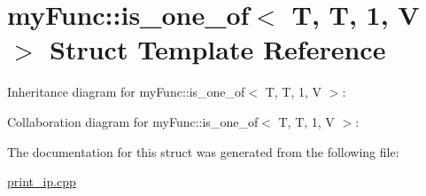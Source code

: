 \hypertarget{structmyFunc_1_1is__one__of_3_01T_00_01T_00_011_00_01V_01_4}{}\section{my\+Func\+:\+:is\+\_\+one\+\_\+of$<$ T, T, 1, V $>$ Struct Template Reference}
\label{structmyFunc_1_1is__one__of_3_01T_00_01T_00_011_00_01V_01_4}


Inheritance diagram for my\+Func\+:\+:is\+\_\+one\+\_\+of$<$ T, T, 1, V $>$\+:


Collaboration diagram for my\+Func\+:\+:is\+\_\+one\+\_\+of$<$ T, T, 1, V $>$\+:


The documentation for this struct was generated from the following file\+:\begin{DoxyCompactItemize}
\item 
\hyperlink{print__ip_8cpp}{print\+\_\+ip.\+cpp}\end{DoxyCompactItemize}
